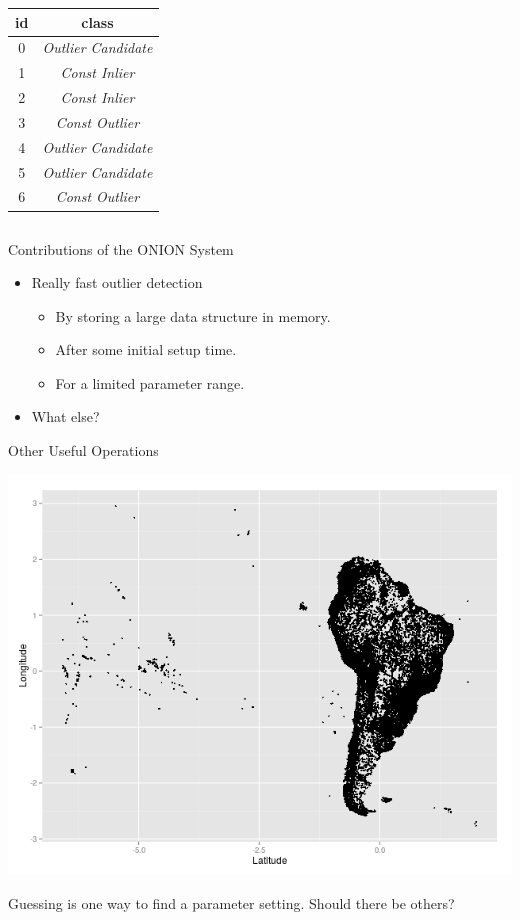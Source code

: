 \documentclass{beamer}
\begin{document}
\begin{frame}
{\begin{columns}
\begin{column}{.5\textwidth}
\begin{tabular}{|c|c|}
                    id & class \\
                    \hline
                    0 & \textit{Outlier Candidate} \\
                    1 & \textit{Const Inlier} \\
                    2 & \textit{Const Inlier} \\
                    3 & \textit{Const Outlier} \\
                    4 & \textit{Outlier Candidate} \\
                    5 & \textit{Outlier Candidate} \\
                    6 & \textit{Const Outlier} \\
                    \hline
                \end{tabular}
            \end{column}
        \end{columns}
    }
    \end{frame}
    \begin{frame}{Contributions of the ONION System}
        \begin{itemize}
            \item Really fast outlier detection 
                \begin{itemize}
                    \item By storing a large data structure in memory.
                    \item After some initial setup time.
                    \item For a limited parameter range.
                \end{itemize}
            \item What else?
        \end{itemize}
    \end{frame}
    \begin{frame}{Other Useful Operations}
    \begin{center}
        \includegraphics[width=\textwidth]{images/south_america.png}
    \end{center}
    Guessing is one way to find a parameter setting. Should there be others?
    \end{frame}
\end{document}
